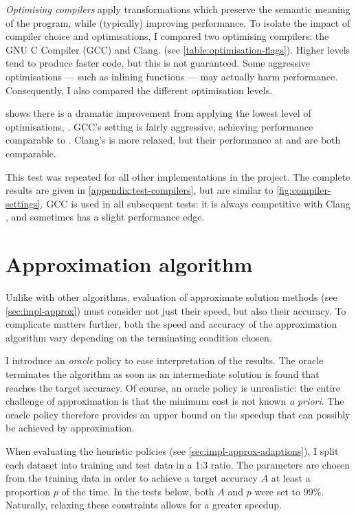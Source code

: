 \emph{Optimising compilers} apply transformations which preserve the semantic meaning of the program, while (typically) improving performance. To isolate the impact of compiler choice and optimisations, I compared two optimising compilers: the GNU C Compiler (GCC) and Clang. (see \cref{table:optimisation-flags}). Higher levels tend to produce faster code, but this is not guaranteed. Some aggressive optimisations --- such as inlining functions --- may actually harm performance. Consequently, I also compared the different optimisation levels.

 shows there is a dramatic improvement from applying the lowest level of optimisations, . GCC's  setting is fairly aggressive, achieving performance comparable to . Clang's is more relaxed, but their performance at  and  are both comparable.

This test was repeated for all other implementations in the project. The complete results are given in \cref{appendix:test-compilers}, but are similar to \cref{fig:compiler-settings}. GCC  is used in all subsequent tests: it is always competitive with Clang , and sometimes has a slight performance edge.

\section{Approximation algorithm} \label{sec:eval-approx}

Unlike with other algorithms, evaluation of approximate solution methods (see \cref{sec:impl-approx}) must consider not just their speed, but also their accuracy\footnotemark. To complicate matters further, both the speed and accuracy of the approximation algorithm vary depending on the terminating condition chosen.

I introduce an \emph{oracle} policy to ease interpretation of the results. The oracle terminates the algorithm as soon as an intermediate solution is found that reaches the target accuracy. Of course, an oracle policy is unrealistic: the entire challenge of approximation is that the minimum cost is not known \textit{a priori}. The oracle policy therefore provides an upper bound on the speedup that can possibly be achieved by approximation.

When evaluating the heuristic policies (see \cref{sec:impl-approx-adaptions}), I split each dataset into training and test data in a 1:3 ratio. The parameters are chosen from the training data in order to achieve a target accuracy $A$ at least a proportion $p$ of the time. In the tests below, both $A$ and $p$ were set to 99\%. Naturally, relaxing these constraints allows for a greater speedup.

